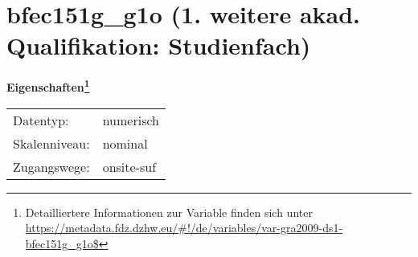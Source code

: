 
    \setcounter{footnote}{0}

    \vspace*{-1.8cm}
	\section{bfec151g\_g1o (1. weitere akad. Qualifikation: Studienfach)}
	\label{section:bfec151g_g1o}



    \vspace*{0.5cm}
    \noindent\textbf{Eigenschaften\footnote{Detailliertere Informationen zur Variable finden sich unter
		\url{https://metadata.fdz.dzhw.eu/\#!/de/variables/var-gra2009-ds1-bfec151g_g1o$}}}\\
	\begin{tabularx}{\hsize}{@{}lX}
	Datentyp: & numerisch \\
	Skalenniveau: & nominal \\
	Zugangswege: &
	  onsite-suf
 \\
    \end{tabularx}



